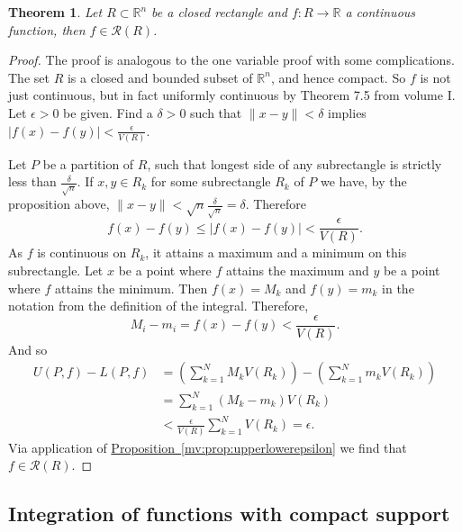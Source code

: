 \documentclass[12pt]{book}
\newcommand{\volIref}[1]{#1}
\newcommand{\snorm}[1]{\lVert {#1} \rVert}
\newcommand{\abs}[1]{\left\lvert {#1} \right\rvert}
\newcommand{\R}{{\mathbb{R}}}
\newcommand{\sR}{{\mathcal{R}}}
\theoremstyle{plain}
\newtheorem{thm}{Theorem}[section]
\theoremstyle{remark}
\theoremstyle{definition}
\theoremstyle{exercise}
\theoremstyle{example}
\newcommand{\propref}[1]{\hyperref[#1]{Proposition~\ref*{#1}}}
\begin{document}
\begin{thm} \label{mv:thm:contintrect}
Let $R \subset \R^n$ be a closed rectangle and
$f \colon R \to \R$ a continuous function,
then $f \in \sR(R)$.
\end{thm}

\begin{proof}
The proof is analogous to the one variable proof with some complications.
The set $R$ is a closed and bounded subset of $\R^n$, and hence compact.  So
$f$ is not just continuous, but in fact uniformly continuous 
by \volIref{Theorem 7.5 from volume I}.
Let $\epsilon > 0$ be given.  Find a $\delta > 0$ such that
$\snorm{x-y} < \delta$ implies $\abs{f(x)-f(y)} < \frac{\epsilon}{V(R)}$.

Let $P$ be a partition of $R$, such that longest side of any subrectangle
is strictly less than $\frac{\delta}{\sqrt{n}}$.
If $x, y \in R_k$ for some subrectangle $R_k$ of $P$ we have,
by the proposition above,
$\snorm{x-y} < \sqrt{n} \frac{\delta}{\sqrt{n}} = \delta$.  Therefore
\begin{equation*}
f(x)-f(y) \leq \abs{f(x)-f(y)} < \frac{\epsilon}{V(R)} .
\end{equation*}
As $f$ is continuous on $R_k$, it attains a maximum and a minimum
on this subrectangle.
Let $x$ be a point where $f$ attains the maximum and $y$ be a point
where $f$ attains the minimum.  Then $f(x) = M_k$
and $f(y) = m_k$ in the notation from the definition of the integral.
Therefore,
\begin{equation*}
M_i-m_i = f(x)-f(y) < 
\frac{\epsilon}{V(R)} .
\end{equation*}
And so
\begin{equation*}
\begin{split}
U(P,f) - L(P,f)
& =
\left(
\sum_{k=1}^N
M_k V(R_k)
\right)
-
\left(
\sum_{k=1}^N
m_k V(R_k)
\right)
\\
& =
\sum_{k=1}^N
(M_k-m_k) V(R_k)
\\
& <
\frac{\epsilon}{V(R)}
\sum_{k=1}^N
V(R_k)
= \epsilon.
\end{split}
\end{equation*}
Via application of \propref{mv:prop:upperlowerepsilon} we find that $f \in
\sR(R)$.
\end{proof}

\subsection{Integration of functions with compact support}
\end{document}
